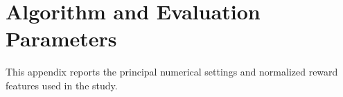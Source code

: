 \documentclass[journal,twoside,web]{ieeecolor}
\begin{document}
\clearpage
\raggedbottom
\useRomanappendicesfalse
\appendices
\section{Algorithm and Evaluation Parameters}
\label{app:parameters}
\setcounter{table}{0}
\setcounter{equation}{0}
\renewcommand{\thetable}{A.\arabic{table}}
\renewcommand{\theequation}{A\arabic{equation}}

This appendix reports the principal numerical settings and normalized reward
features used in the study.

\FloatBarrier
\begingroup
\centering
\fontsize{8}{9.4}\selectfont
\setlength{\tabcolsep}{3pt}
\renewcommand{\arraystretch}{1.00}
\setlength{\defaultaddspace}{2pt}
\setlength{\jot}{0pt}
\label{tab:setup_params}
\end{document}
